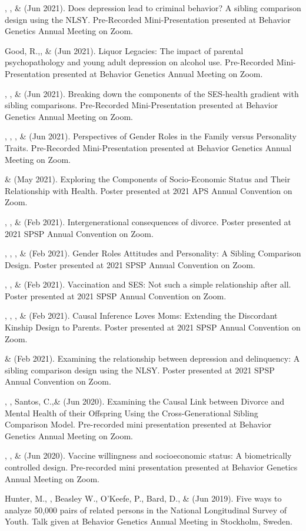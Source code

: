 %
\item \emsims, \jt, \&  \meb (Jun 2021). Does depression lead to criminal behavior? A sibling comparison design using the NLSY. Pre-Recorded Mini-Presentation presented at Behavior Genetics Annual Meeting on Zoom.
%
\item Good, R.,\noteA \yrh, \&  \meb (Jun 2021). Liquor Legacies: The impact of parental psychopathology and young adult depression on alcohol use. Pre-Recorded Mini-Presentation presented at Behavior Genetics Annual Meeting on Zoom.
%
\item \yrh, \jt, \& \meb (Jun 2021). Breaking down the components of the SES-health gradient with sibling comparisons. Pre-Recorded Mini-Presentation presented at Behavior Genetics Annual Meeting on Zoom.
%
\item \sherrym, \yrh, \jt, \& \meb (Jun 2021). Perspectives of Gender Roles in the Family versus Personality Traits.  Pre-Recorded Mini-Presentation presented at Behavior Genetics Annual Meeting on Zoom.
%
\item \yrh \& \meb (May 2021). Exploring the Components of Socio-Economic Status and Their Relationship with Health. Poster presented at 2021 APS Annual Convention on Zoom.
%
\item \kl, \jt, \& \meb (Feb 2021). Intergenerational consequences of divorce. Poster presented at 2021 SPSP Annual Convention on Zoom.
%
\item \sherrym, \yrh, \jt, \& \meb (Feb 2021). Gender Roles Attitudes and Personality: A Sibling Comparison Design. Poster presented at 2021 SPSP Annual Convention on Zoom.
%
\item \jt, \kl, \& \meb (Feb 2021). Vaccination and SES: Not such a simple relationship after all. Poster presented at 2021 SPSP Annual Convention on Zoom.
%
\item \meb, \emsims, \jt, \& \kl  (Feb 2021). Causal Inference Loves Moms: Extending the Discordant Kinship Design to Parents. Poster presented at 2021 SPSP Annual Convention on Zoom.
%
\item \emsims\hspace* {2 pt} \& \meb (Feb 2021). Examining the relationship between depression and delinquency: A sibling comparison design using the NLSY. Poster presented at 2021 SPSP Annual Convention on Zoom.

\item \kl, \jt, Santos, C.,\noteB \& \meb (Jun 2020). Examining the Causal Link between Divorce and Mental Health of their Offspring Using the Cross-Generational Sibling Comparison Model. Pre-recorded mini presentation presented at Behavior Genetics Annual Meeting on Zoom.
%
\item \jt, \kl, \& \meb (Jun 2020). Vaccine willingness and socioeconomic status: A biometrically controlled design. Pre-recorded mini presentation presented at Behavior Genetics Annual Meeting on Zoom. 
%
\item Hunter, M., \meb, Beasley W., O'Keefe, P.,  Bard, D., \& \Joe (Jun 2019). Five ways to analyze 50,000 pairs of related persons in the National Longitudinal Survey of Youth. Talk given at Behavior Genetics Annual Meeting in Stockholm, Sweden. 

